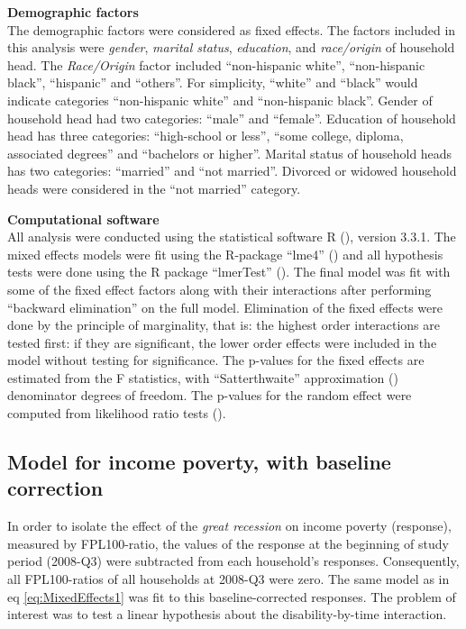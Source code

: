 \documentclass[11pt]{extarticle} %
\begin{document}
\noindent
{\bf{Demographic factors}}\\
The demographic factors were considered as fixed effects. The factors included in this analysis were {\emph{gender}}, {\emph{marital status}}, {\emph{education}}, and {\emph{race/origin}} of household head. The {\emph{Race/Origin}} factor included ``non-hispanic white'', ``non-hispanic black'', ``hispanic'' and ``others''. For simplicity, ``white'' and ``black'' would indicate categories ``non-hispanic white'' and ``non-hispanic black''. Gender of household head had two categories: ``male'' and ``female''. Education of household head has three categories: ``high-school or less'', ``some college, diploma, associated degrees'' and ``bachelors or higher''. Marital status of household heads has two categories: ``married'' and ``not married''. Divorced or widowed household heads were considered in the ``not married'' category. 

\noindent
{\bf{Computational software}}\\
All analysis were conducted using the statistical software R (\cite{R}), version 3.3.1. The mixed effects models were fit using the R-package ``lme4'' (\cite{R-lme4}) and all hypothesis tests were done using the R package ``lmerTest'' (\cite{Kuznetsova_etal_2015_R-lmerTest}). The final model was fit with some of the fixed effect factors along with their interactions after performing ``backward elimination'' on the full model. Elimination of the fixed effects were done by the principle of marginality, that is: the highest order interactions are tested first: if they are significant, the lower order effects were included in the model without testing for significance. The p-values for the fixed effects are estimated from the F statistics, with ``Satterthwaite'' approximation (\cite{Satterthwaite_1946_Biometrics}) denominator degrees of freedom. The p-values for the random effect were computed from likelihood ratio tests (\cite{Morrell_1998_Biometrics}). 

\subsection{Model for income poverty, with baseline correction} \label{baselineCorrection}
In order to isolate the effect of the {\emph{great recession}} on income poverty (response), measured by FPL100-ratio, the values of the response at the beginning of study period (2008-Q3) were subtracted from each household's responses. Consequently, all FPL100-ratios of all households at 2008-Q3 were zero. The same model as in eq \ref{eq:MixedEffects1} was fit to this baseline-corrected responses. The problem of interest was to test a linear hypothesis about the disability-by-time interaction. 
\end{document}
